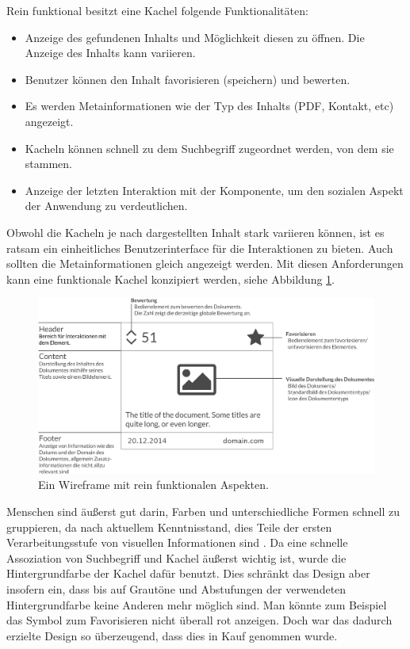 \documentclass[12pt,twoside]{book}
\begin{document}
Rein funktional besitzt eine Kachel folgende Funktionalitäten:

\begin{itemize}
  \item Anzeige des gefundenen Inhalts und Möglichkeit diesen zu öffnen. Die Anzeige des Inhalts kann variieren.
  \item Benutzer können den Inhalt favorisieren (speichern) und bewerten.
  \item Es werden Metainformationen wie der Typ des Inhalts (PDF, Kontakt, etc) angezeigt.
  \item Kacheln können schnell zu dem Suchbegriff zugeordnet werden, von dem sie stammen.
  \item Anzeige der letzten Interaktion mit der Komponente, um den sozialen Aspekt der Anwendung zu verdeutlichen.
\end{itemize}

Obwohl die Kacheln je nach dargestellten Inhalt stark variieren können, ist es ratsam ein einheitliches Benutzerinterface für die Interaktionen zu bieten. Auch sollten die Metainformationen gleich angezeigt werden.
Mit diesen Anforderungen kann eine funktionale Kachel konzipiert werden, siehe Abbildung \ref{fig:tile_prototype}.

\begin{figure}[htbp]
    \centering
    \includegraphics[width=1.0\textwidth]{images/tiles.eps}
    \caption{Ein Wireframe mit rein funktionalen Aspekten.}
    \label{fig:tile_prototype}
\end{figure}

Menschen sind äußerst gut darin, Farben und unterschiedliche Formen schnell zu gruppieren, da nach aktuellem Kenntnisstand, dies Teile der ersten Verarbeitungsstufe von visuellen Informationen sind \citep{treisman1987merkmale}. Da eine schnelle Assoziation von Suchbegriff und Kachel äußerst wichtig ist, wurde die Hintergrundfarbe der Kachel dafür benutzt. Dies schränkt das Design aber insofern ein, dass bis auf Grautöne und Abstufungen der verwendeten Hintergrundfarbe keine Anderen mehr möglich sind. Man könnte zum Beispiel das Symbol zum Favorisieren nicht überall rot anzeigen. Doch war das dadurch erzielte Design so überzeugend, dass dies in Kauf genommen wurde.
\end{document}
